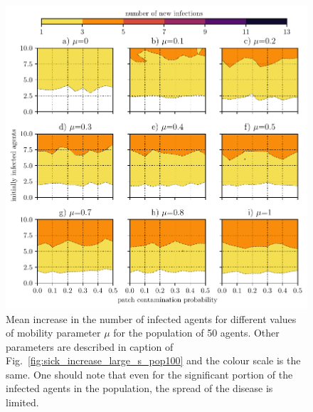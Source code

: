 \documentclass[10pt,a4paper]{article}
\begin{document}
\begin{figure}[ht!]
\begin{center}
\includegraphics[scale=0.7]{plots/sick_increase_large_s_pop50.pdf}
\end{center}
\caption{Mean increase in the number of infected agents for different values of mobility parameter $\mu$ for the population of 50 agents. Other parameters are described in caption of Fig.~\ref{fig:sick_increase_large_s_pop100} and the colour scale is the same. One should note that even for the significant portion of the infected agents in the population, the spread of the disease is limited.}
\label{fig:sick_increase_large_s_pop50}
\end{figure}
\end{document}
